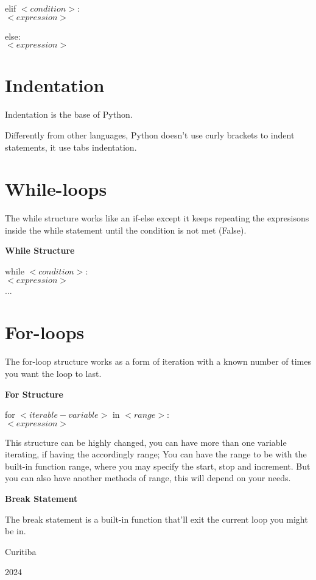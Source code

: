 \documentclass{article}
\begin{document}
elif $<condition>$:\\
    \hspace*{0.85cm}$<expression>$

else:\\
    \hspace*{0.85cm}$<expression>$


\section{Indentation}
Indentation is the base of Python.

Differently from other languages, Python doesn't use
curly brackets to indent statements, it use tabs
indentation.

\section{While-loops}
The while structure works like an if-else except it keeps
repeating the expresisons inside the while statement until
the condition is not met (False).

\textbf{While Structure}

while $<condition>$:\\
    \hspace*{1.5cm}$<expression>$\\
    \hspace*{1.5cm}...

\section{For-loops}
The for-loop structure works as a form of iteration
with a known number of times you want the loop to last.

\textbf{For Structure}

for $<iterable-variable>$ in $<range>$:\\
    \hspace*{1.05cm}$<expression>$

This structure can be highly changed, you can have more than
one variable iterating, if having the accordingly range;
You can have the range to be with the built-in function range,
where you may specify the start, stop and increment. But 
you can also have another methods of range, this will depend
on your needs.

\textbf{Break Statement}

The break statement is a built-in function that'll exit 
the current loop you might be in.

\vfill

\begin{center}
    Curitiba

    2024
\end{center}
\end{document}

